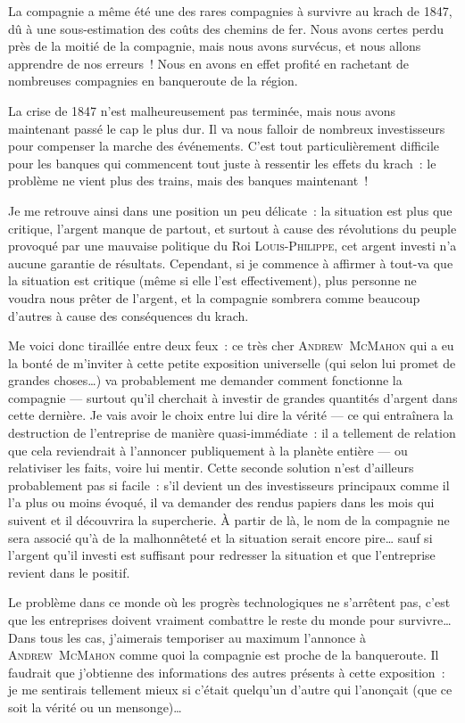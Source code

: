 {La compagnie a même été une des rares compagnies à survivre au krach de 1847, dû à une sous-estimation des coûts des chemins de fer.
Nous avons certes perdu près de la moitié de la compagnie, mais nous avons survécus, et nous allons apprendre de nos erreurs~!
Nous en avons en effet profité en rachetant de nombreuses compagnies en banqueroute de la région.

La crise de 1847 n’est malheureusement pas terminée, mais nous avons maintenant passé le cap le plus dur.
Il va nous falloir de nombreux investisseurs pour compenser la marche des événements.
C’est tout particulièrement difficile pour les banques qui commencent tout juste à ressentir les effets du krach~:  le problème ne vient plus des trains, mais des banques maintenant~!

Je me retrouve ainsi dans une position un peu délicate~:  la situation est plus que critique, l’argent manque de partout, et surtout à cause des révolutions du peuple provoqué par une mauvaise politique du Roi \textsc{Louis-Philippe}, cet argent investi n’a aucune garantie de résultats.
Cependant, si je commence à affirmer à tout-va que la situation est critique (même si elle l’est effectivement), plus personne ne voudra nous prêter de l’argent, et la compagnie sombrera comme beaucoup d’autres à cause des conséquences du krach.

Me voici donc tiraillée entre deux feux~:  ce très cher \textsc{Andrew~McMahon} qui a eu la bonté de m’inviter à cette petite exposition universelle (qui selon lui promet de grandes choses…) va probablement me demander comment fonctionne la compagnie — surtout qu’il cherchait à investir de grandes quantités d’argent dans cette dernière.
Je vais avoir le choix entre lui dire la vérité — ce qui entraînera la destruction de l’entreprise de manière quasi-immédiate~:  il a tellement de relation que cela reviendrait à l’annoncer publiquement à la planète entière — ou relativiser les faits, voire lui mentir.
Cette seconde solution n’est d’ailleurs probablement pas si facile~:  s’il devient un des investisseurs principaux comme il l’a plus ou moins évoqué, il va demander des rendus papiers dans les mois qui suivent et il découvrira la supercherie.
À partir de là, le nom de la compagnie ne sera associé qu’à de la malhonnêteté et la situation serait encore pire… sauf si l’argent qu’il investi est suffisant pour redresser la situation et que l’entreprise revient dans le positif.

Le problème dans ce monde où les progrès technologiques ne s’arrêtent pas, c’est que les entreprises doivent vraiment combattre le reste du monde pour survivre…
Dans tous les cas, j’aimerais temporiser au maximum l’annonce à \textsc{Andrew~McMahon} comme quoi la compagnie est proche de la banqueroute.
Il faudrait que j’obtienne des informations des autres présents à cette exposition~:  je me sentirais tellement mieux si c’était quelqu’un d’autre qui l’anonçait (que ce soit la vérité ou un mensonge)…
}



